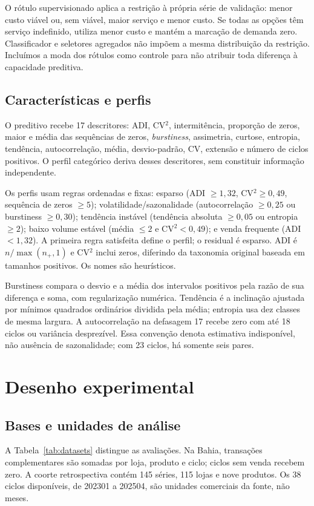 \documentclass[preprint,12pt]{elsarticle}
\begin{document}
O rótulo supervisionado aplica a restrição à própria série de validação: menor custo viável ou, sem viável, maior serviço e menor custo. Se todas as opções têm serviço indefinido, utiliza menor custo e mantém a marcação de demanda zero. Classificador e seletores agregados não impõem a mesma distribuição da restrição. Incluímos a moda dos rótulos como controle para não atribuir toda diferença à capacidade preditiva.

\subsection{Características e perfis}
O preditivo recebe 17 descritores: ADI, CV$^2$, intermitência, proporção de zeros, maior e média das sequências de zeros, \textit{burstiness}, assimetria, curtose, entropia, tendência, autocorrelação, média, desvio-padrão, CV, extensão e número de ciclos positivos. O perfil categórico deriva desses descritores, sem constituir informação independente.

Os perfis usam regras ordenadas e fixas: esparso (ADI $\geq1{,}32$, CV$^2\geq0{,}49$, sequência de zeros $\geq5$); volatilidade/sazonalidade (autocorrelação $\geq0{,}25$ ou burstiness $\geq0{,}30$); tendência instável (tendência absoluta $\geq0{,}05$ ou entropia $\geq2$); baixo volume estável (média $\leq2$ e CV$^2<0{,}49$); e venda frequente (ADI $<1{,}32$). A primeira regra satisfeita define o perfil; o residual é esparso. ADI é $n/\max(n_+,1)$ e CV$^2$ inclui zeros, diferindo da taxonomia original baseada em tamanhos positivos. Os nomes são heurísticos.

Burstiness compara o desvio e a média dos intervalos positivos pela razão de sua diferença e soma, com regularização numérica. Tendência é a inclinação ajustada por mínimos quadrados ordinários dividida pela média; entropia usa dez classes de mesma largura. A autocorrelação na defasagem 17 recebe zero com até 18 ciclos ou variância desprezível. Essa convenção denota estimativa indisponível, não ausência de sazonalidade; com 23 ciclos, há somente seis pares.

\section{Desenho experimental}
\subsection{Bases e unidades de análise}
A Tabela~\ref{tab:datasets} distingue as avaliações. Na Bahia, transações complementares são somadas por loja, produto e ciclo; ciclos sem venda recebem zero. A coorte retrospectiva contém 145 séries, 115 lojas e nove produtos. Os 38 ciclos disponíveis, de 202301 a 202504, são unidades comerciais da fonte, não meses.
\end{document}

